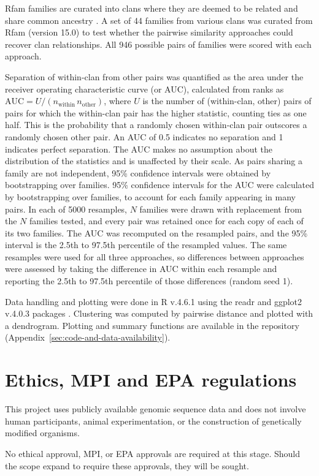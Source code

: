 \label{subsec:clan-benchmark}

Rfam families are curated into clans where they are deemed to be related and share common ancestry \citep{Ontiveros-Palacios2025}.
A set of 44 families from various clans was curated from Rfam (version 15.0) to test whether the pairwise similarity approaches could recover clan relationships.
All 946 possible pairs of families were scored with each approach.

Separation of within-clan from other pairs was quantified as the area under the receiver operating characteristic curve (or \ac{AUC}), calculated from ranks as
$\mathrm{AUC} = U / (n_{\mathrm{within}}\, n_{\mathrm{other}})$, where $U$ is the number of (within-clan, other) pairs of pairs for which the within-clan pair has the higher statistic, counting ties as one half. 
This is the probability that a randomly chosen within-clan pair outscores a randomly chosen other pair. 
An AUC of 0.5 indicates no separation and 1 indicates perfect separation. 
The AUC makes no assumption about the distribution of the statistics and is unaffected by their scale. 
As pairs sharing a family are not independent, 95\% confidence intervals were obtained by bootstrapping over families.
95\% confidence intervals for the \ac{AUC} were calculated by bootstrapping over families, to account for each family appearing in many pairs. 
In each of 5000 resamples, $N$ families were drawn with replacement from the $N$ families tested, and every pair was retained once for each copy of each of its two families.
The \ac{AUC} was recomputed on the resampled pairs, and the 95\% interval is the 2.5th to 97.5th percentile of the resampled values. 
The same resamples were used for all three approaches, so differences between approaches were assessed by taking the difference in \ac{AUC} within each resample and reporting the 2.5th to 97.5th percentile of those differences (random seed 1).

Data handling and plotting were done in R v.4.6.1 using the readr and ggplot2 v.4.0.3 packages \citep{Wickham2016}.
Clustering was computed by pairwise distance and plotted with a dendrogram.
Plotting and summary functions are available in the repository (Appendix~\ref{sec:code-and-data-availability}).


\section{Ethics, MPI and EPA regulations}

This project uses publicly available genomic sequence data and does not involve human participants, animal experimentation, or the construction of genetically modified organisms.

No ethical approval, MPI, or EPA approvals are required at this stage. 
Should the scope expand to require these approvals, they will be sought.
